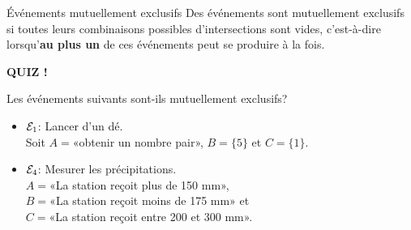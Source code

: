 \documentclass{BeamerTemplate}
\begin{document}
\begin{frame}[t]%
 \begin{Boite}{Événements mutuellement exclusifs}
  Des événements sont \alert{mutuellement exclusifs} si toutes
  leurs combinaisons possibles d'intersections sont vides, c'est-à-dire
  lorsqu'\textbf{au plus un} de ces événements peut se produire à
  la fois. %
 \end{Boite}

 \medskip


 {\small {}}
\end{frame}


\begin{frame}[t]%

\centerline{\LARGE \bf \alert{QUIZ !}}

 Les événements suivants sont-ils mutuellement exclusifs?
 \medskip

 {\small  %
  \begin{itemize}\itemsep1.3cm
   \item ${\cal{E}}_1$: Lancer d'un dé.\\
   Soit $A=$«obtenir un nombre pair», $B=\{5\}$ et $C=\{1\}$. \\
   \item<2-> ${\cal{E}}_4$: Mesurer les précipitations.\\
   $A=$«La station reçoit plus de 150 mm»,\\
   $B=$«La station reçoit moins de 175 mm» et \\$C=$«La station reçoit
   entre 200 et 300 mm». \\%
   \vspace{1.3cm}
 \end{itemize}
 }
\end{frame}
\end{document}
